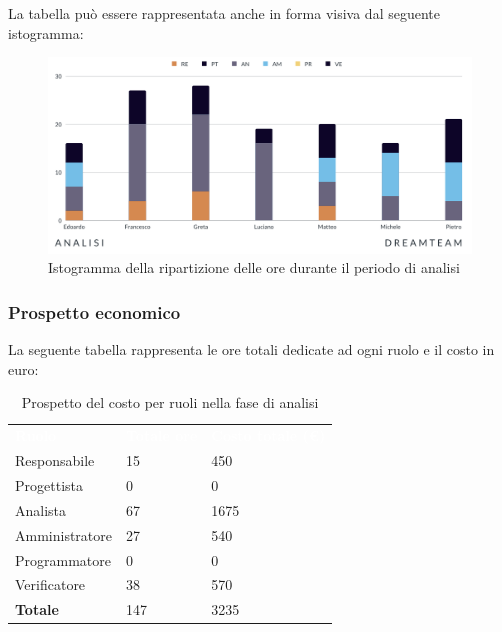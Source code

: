 La tabella può essere rappresentata anche in forma visiva dal seguente istogramma: 
\begin{figure}[H]
\centering
\includegraphics[scale=0.65]{Sezioni/SezioniPreventivo/grafici/Analisi.png}
\caption{Istogramma della ripartizione delle ore durante il periodo di analisi}
\end{figure}

\subsubsection{Prospetto economico}
La seguente tabella rappresenta le ore totali dedicate ad ogni ruolo e il costo in euro:

\begin{table}[H]
\begin{center}
\renewcommand{\arraystretch}{1.5}
\begin{tabular}{ m{}<{\centering}  m{}<{\centering} m{}<{\centering}}
	\rowcolor{darkblue}
	\textcolor{white}{\textbf{Ruolo}}&\textcolor{white}{\textbf{Totale ore}}&\textcolor{white}{\textbf{Costo totale (\euro)}}\\ 

	Responsabile  & 15 &  450\\	
	
	Progettista & 0 &  0 \\
	
	Analista & 67 &  1675\\

	Amministratore & 27 &  540\\
	
	Programmatore & 0 &  0\\
	
	Verificatore & 38 &  570\\
	
	\textbf{Totale} & 147 &  3235 \\
	
\end{tabular}
\caption{Prospetto del costo per ruoli nella fase di analisi}
\end{center}
\end{table}

